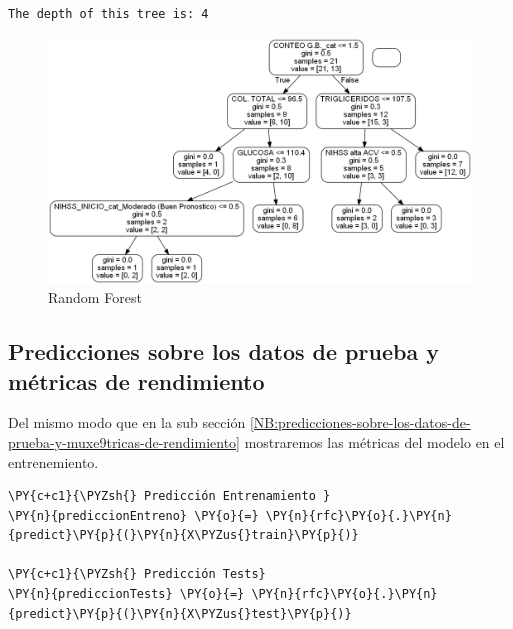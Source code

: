     \begin{Verbatim}[commandchars=\\\{\}]
The depth of this tree is: 4
    \end{Verbatim}
\begin{figure}
	\centering
	\includegraphics[scale=0.6]{Random Forest - Bosque Aleatorio/randomForestClassification.png} 
	\caption{Random Forest}
\end{figure}
    \hypertarget{predicciones-sobre-los-datos-de-prueba-y-muxe9tricas-de-rendimiento}{%
\subsection{Predicciones sobre los datos de prueba y métricas de rendimiento}\label{predicciones-sobre-los-datos-de-prueba-y-muxe9tricas-de-rendimiento}}

	Del mismo modo que en la sub sección \ref{NB:predicciones-sobre-los-datos-de-prueba-y-muxe9tricas-de-rendimiento} mostraremos las métricas del modelo en el entrenemiento.

    \begin{tcolorbox}[breakable, size=fbox, boxrule=1pt, pad at break*=1mm,colback=cellbackground, colframe=cellborder]
\begin{Verbatim}[commandchars=\\\{\}]
\PY{c+c1}{\PYZsh{} Predicción Entrenamiento }
\PY{n}{prediccionEntreno} \PY{o}{=} \PY{n}{rfc}\PY{o}{.}\PY{n}{predict}\PY{p}{(}\PY{n}{X\PYZus{}train}\PY{p}{)}

\PY{c+c1}{\PYZsh{} Predicción Tests}
\PY{n}{prediccionTests} \PY{o}{=} \PY{n}{rfc}\PY{o}{.}\PY{n}{predict}\PY{p}{(}\PY{n}{X\PYZus{}test}\PY{p}{)}
\end{Verbatim}
\end{tcolorbox}

